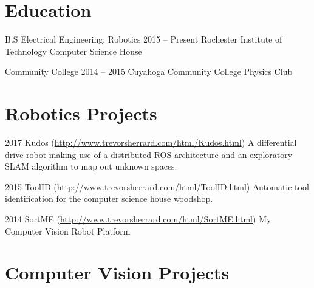 \documentclass{tccv}
\begin{document}
\section{Education}

\begin{yearlist}

\item[B.S Electrical Engineering; Robotics]{2015 -- Present}
     {Rochester Institute of Technology}
     {Computer Science House}
     
\item[Community College]{2014 -- 2015}
     {Cuyahoga Community College}
     {Physics Club}
     

\end{yearlist}


\section{Robotics Projects}

\begin{yearlist}

\item{2017}
     {Kudos (\href{http://www.trevorsherrard.com/html/Kudos.html}{http://www.trevorsherrard.com\newline/html/Kudos.html})}
     {A differential drive robot making use of a distributed ROS architecture and an exploratory SLAM algorithm to map out unknown spaces.}

\item{2015}
	{ToolID (\href{http://www.trevorsherrard.com/html/ToolID.html}
	{http://www.trevorsherrard.com\newline/html/ToolID.html})}
	{Automatic tool identification for the computer science house woodshop. }

\item{2014}
     {SortME (\href{http://www.trevorsherrard.com/html/SortME.html}{http://www.trevorsherrard.com\newline/html/SortME.html})}
     {My Computer Vision Robot Platform}
     
\end{yearlist}


\section{Computer Vision Projects}
\end{document}
